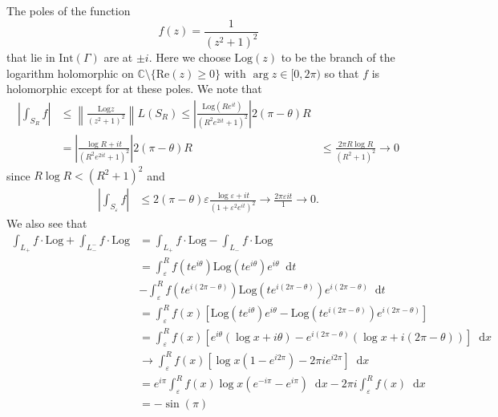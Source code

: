 \documentclass{article}
\newcommand\Log{\mathrm{Log}}
\renewcommand\Re{\mathrm{Re}}
\newcommand\dif{\mathop{}\!\mathrm{d}}
\begin{document}
The poles of the function
$$
  f(z)
= \frac{1}{(z^2 + 1)^2}
$$
that lie in $\mathrm{Int}(\Gamma)$ are at $\pm i$. Here we choose
$\Log(z)$ to be the branch of the logarithm holomorphic on
$\mathbb{C} \setminus \{ \Re(z) \geq 0 \}$ with $\arg z \in [0, 2\pi)$
so that $f$ is holomorphic except for at these poles. We note
that
\begin{align*}
      \left|
        \int_{S_R}
          f
      \right|
&\leq \left\|
        \frac{\Log z}
             {(z^2 + 1)^2}
      \right\|
      L(S_R)
 \leq \left|
        \frac{\Log (Re^{it})}
             {(R^2e^{2it} + 1)^2}
      \right|
      2(\pi - \theta)R \\
&=    \left|
        \frac{\log R + it}
             {(R^2e^{2it} + 1)^2}
      \right|
      2(\pi - \theta)R
&\leq \frac{2 \pi R \log R}
           {(R^2 + 1)^2}
 \to  0
\end{align*}
since $R \log R < (R^2 + 1)^2$ and
\begin{align*}
      \left|
        \int_{S_\varepsilon}
          f
        \right|
&\leq 2 (\pi - \theta) \varepsilon
      \frac{\log \varepsilon + it}
           {(1 + \varepsilon^2 e^{it})^2}
 \to  \frac{2 \pi \varepsilon i t}
           {1}
 \to  0.
\end{align*}
We also see that
\begin{align*}
   \int_{L_+}
     f \cdot \Log
 + \int_{L_-^-}
     f \cdot \Log
&= \int_{L_+}
     f \cdot \Log
 - \int_{L_-}
     f \cdot \Log \\
&= \int_\varepsilon^R
     f(t e^{i\theta})
     \Log(t e^{i\theta})
     e^{i\theta}
     \dif t \\
&- \int_\varepsilon^R
     f(t e^{i(2\pi - \theta)})
     \Log(t e^{i (2 \pi - \theta)})
     e^{i(2\pi - \theta)}
     \dif t \\
&= \int_\varepsilon^R
     f(x)
     [ \Log (t e^{i \theta})
       e^{i \theta}
     - \Log (t e^{i (2 \pi - \theta)})
       e^{i (2\pi - \theta)}
     ] \\
&=   \int_\varepsilon^R
       f(x)
       [ e^{i \theta} (\log x + i \theta)
       - e^{i (2\pi - \theta)} (\log x + i (2\pi - \theta)) ]
       \dif x \\
&\to \int_\varepsilon^R
       f(x) [ \log x (1 - e^{i 2 \pi}) - 2 \pi i e^{i 2 \pi} ]
       \dif x \\
&=   e^{i \pi}
     \int_\varepsilon^R
       f(x) \log x (e^{-i \pi} - e^{i \pi})
       \dif x
   - 2 \pi i
     \int_\varepsilon^R
       f(x) \dif x \\
&=   -\sin(\pi)

\end{align*}
\end{document}
